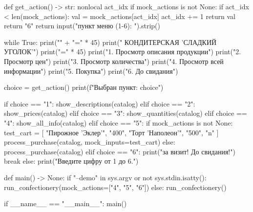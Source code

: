 \documentclass[14pt,a4paper]{extarticle}
\begin{document}
\begin{CodeListing}
    def get_action() -> str:
        nonlocal act_idx
        if mock_actions is not None:
            if act_idx < len(mock_actions):
                val = mock_actions[act_idx]
                act_idx += 1
                return val
            return "6"
        return input(" пункт меню (1-6): ").strip()

    while True:
        print("\n" + "=" * 45)
        print("     КОНДИТЕРСКАЯ 'СЛАДКИЙ УГОЛОК'")
        print("=" * 45)
        print("1. Просмотр описания продукции")
        print("2. Просмотр цен")
        print("3. Просмотр количества")
        print("4. Просмотр всей информации")
        print("5. Покупка")
        print("6. До свидания")

        choice = get_action()
        print(f"Выбран пункт: {choice}")

        if choice == "1":
            show_descriptions(catalog)
        elif choice == "2":
            show_prices(catalog)
        elif choice == "3":
            show_quantities(catalog)
        elif choice == "4":
            show_all_info(catalog)
        elif choice == "5":
            if mock_actions is not None:
                test_cart = [
                    "Пирожное 'Эклер'", "400",
                    "Торт 'Наполеон'", "500",
                    "n"
                ]
                process_purchase(catalog, mock_inputs=test_cart)
            else:
                process_purchase(catalog)
        elif choice == "6":
            print(" за визит! До свидания!")
            break
        else:
            print("Введите цифру от 1 до 6.")


def main() -> None:
    if "--demo" in sys.argv or not sys.stdin.isatty():
        run_confectionery(mock_actions=["4", "5", "6"])
    else:
        run_confectionery()


if __name__ == "__main__":
    main()
\end{CodeListing}
\end{document}
